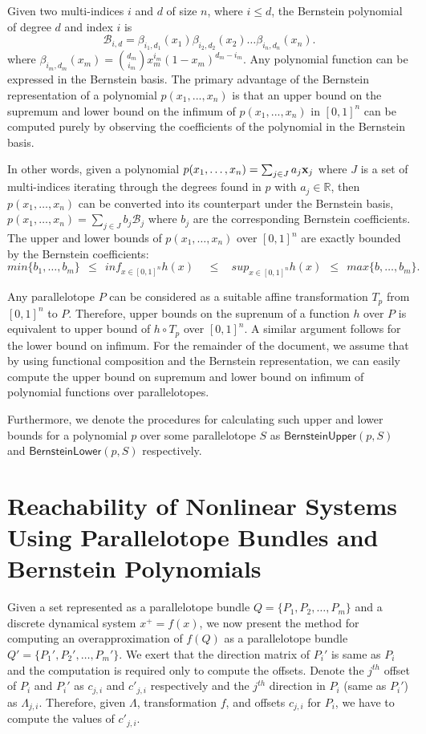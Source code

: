 \documentclass[EPiC]{easychair}
\begin{document}
Given two multi-indices $i$ and $d$ of size $n$, where $i \leq d$, the Bernstein polynomial of degree $d$ and index $i$ is 
$$
\mathcal{B}_{i,d} = \beta_{i_1,d_1}(x_1) \beta_{i_2,d_2}(x_2)\ldots \beta_{i_n,d_n}(x_n).
$$
%
where $\beta_{i_m,d_m}(x_m) = \binom{d_m}{i_m}x_{m}^{i_m}(1-x_m)^{d_m - i_m}$. 
%
Any polynomial function can be expressed in the Bernstein basis. 
%
The primary advantage of the Bernstein representation of a polynomial $p(x_1,...,x_n)$ is that an upper bound on the supremum and lower bound on the infimum of $p(x_1,...,x_n)$ in $[0,1]^{n}$ can be computed purely by observing the coefficients of the polynomial in the Bernstein basis.

In other words, given a polynomial $p(x_1,\ldots,x_n) = \sum_{j \in J} a_j {\bf x}_{j}$ where $J$ is a set of multi-indices iterating through the degrees found in $p$ with $a_j \in \mathbb{R}$, then $p(x_1,\ldots,x_n)$ can be converted into its counterpart under the Bernstein basis, $p(x_1,\ldots,x_n) = \sum_{j \in J} b_j \mathcal{B}_j $ where $b_j$ are the corresponding Bernstein coefficients. The upper and lower bounds of $p(x_1,\ldots,x_n)$ over $[0,1]^n$ are exactly bounded by the Bernstein coefficients:
$$
min \{b_1, \ldots, b_m\} ~~\leq~~ inf_{x \in [0,1]^n} h(x) ~~~~~\leq~~~~ sup_{x \in [0,1]^{n}} h(x) ~~\leq~~ max \{b, \ldots, b_m\}.
$$

Any parallelotope $P$ can be considered as a suitable affine transformation $T_{p}$ from $[0,1]^{n}$ to $P$. 
%
Therefore, upper bounds on the suprenum of a function $h$ over $P$ is equivalent to upper bound of $h \circ T_{p}$ over $[0,1]^{n}$.
%
A similar argument follows for the lower bound on infimum.
%
For the remainder of the document, we assume that by using functional composition and the Bernstein representation, we can easily compute the upper bound on supremum and lower bound on infimum of polynomial functions over parallelotopes.
%

Furthermore, we denote the procedures for calculating such upper and lower bounds for a polynomial $p$ over some parallelotope $S$ as $\mathsf{BernsteinUpper}(p,S)$ and $\mathsf{BernsteinLower}(p,S)$ respectively. 

\section{Reachability of Nonlinear Systems Using Parallelotope Bundles and Bernstein Polynomials}

Given a set represented as a parallelotope bundle $Q = \{P_1, P_2, \ldots, P_m\}$ and a discrete dynamical system $x^{+} = f(x)$, we now present the method for computing an overapproximation of $f(Q)$ as a parallelotope bundle $Q' = \{P_1', P_2', \ldots, P_m'\}$.
%
We exert that the direction matrix of $P_i'$ is same as $P_i$ and the computation is required only to compute the offsets. 
%
Denote the $j^{th}$ offset of $P_i$ and $P_i'$ as $c_{j,i}$ and $c'_{j,i}$ respectively and the $j^{th}$ direction in $P_i$ (same as $P_i'$) as $\Lambda_{j,i}$.
%
Therefore, given $\Lambda$, transformation $f$, and offsets $c_{j,i}$ for $P_i$, we have to compute the values of $c'_{j,i}$.
\end{document}
